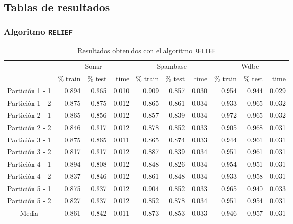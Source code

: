 \documentclass[11pt]{article}
\theoremstyle{plain}
\theoremstyle{definition}
\begin{document}
\subsection{Tablas de resultados}
\subsubsection{Algoritmo \texttt{RELIEF}}

\begin{table}[H]
\centering
\caption{Resultados obtenidos con el algoritmo \texttt{RELIEF}}
\label{tbl-relief}
\begin{tabular}{@{}crrrrrrrrr@{}}
  \toprule
  & \multicolumn{3}{c}{Sonar} & \multicolumn{3}{c}{Spambase} & \multicolumn{3}{c}{Wdbc}  \\
  \cmidrule(r){2-10}
           & \% train & \% test & time & \% train   & \% test   & time & \% train & \% test & time \\
  \midrule
Partición 1 - 1      & 0.894 & 0.865 & 0.010  & 0.909 & 0.857 & 0.030   & 0.954 & 0.944 & 0.029   \\
Partición 1 - 2      & 0.875 & 0.875 & 0.012  & 0.865 & 0.861 & 0.034   & 0.933 & 0.965 & 0.032   \\
Partición 2 - 1      & 0.865 & 0.856 & 0.012  & 0.857 & 0.839 & 0.034   & 0.972 & 0.965 & 0.032   \\
Partición 2 - 2      & 0.846 & 0.817 & 0.012  & 0.878 & 0.852 & 0.033   & 0.905 & 0.968 & 0.031   \\
Partición 3 - 1      & 0.875 & 0.865 & 0.011  & 0.865 & 0.874 & 0.033   & 0.944 & 0.961 & 0.031   \\
Partición 3 - 2      & 0.817 & 0.817 & 0.012  & 0.887 & 0.839 & 0.034   & 0.951 & 0.961 & 0.031   \\
Partición 4 - 1      & 0.894 & 0.808 & 0.012  & 0.848 & 0.826 & 0.034   & 0.954 & 0.951 & 0.031   \\
Partición 4 - 2      & 0.837 & 0.846 & 0.012  & 0.861 & 0.848 & 0.034   & 0.933 & 0.958 & 0.031   \\
Partición 5 - 1      & 0.875 & 0.837 & 0.012  & 0.904 & 0.852 & 0.033   & 0.965 & 0.940 & 0.033   \\
Partición 5 - 2      & 0.827 & 0.837 & 0.012  & 0.852 & 0.878 & 0.034   & 0.951 & 0.954 & 0.031   \\
  \bottomrule
Media                & 0.861 & 0.842 & 0.011  & 0.873 & 0.853 & 0.033   & 0.946 & 0.957 & 0.031   \\
\end{tabular}
\end{table}
\end{document}
